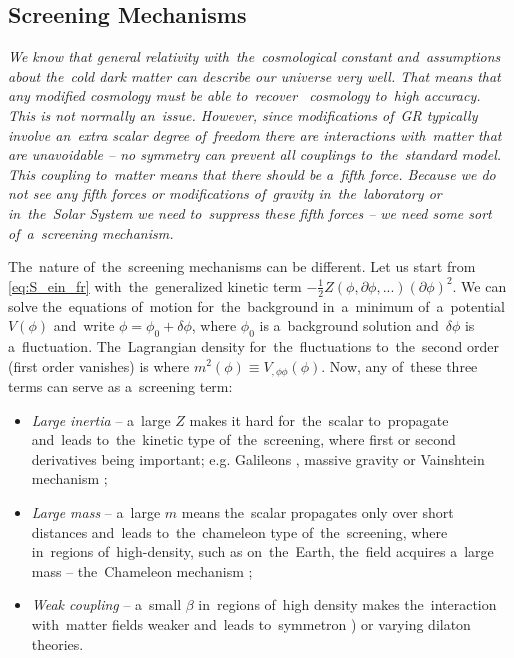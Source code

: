 \subsection{Screening Mechanisms}
{\itshape
We know that general relativity with~the~cosmological constant and~assumptions about the~cold dark matter can describe our universe very well. That means that any modified cosmology must be able to~recover \LCDM\ cosmology to~high accuracy. This is not normally an~issue. However, since modifications of~GR typically involve an~extra scalar degree of~freedom there are interactions with~matter that are unavoidable -- no symmetry can prevent all couplings to~the~standard model. This coupling to~matter means that there should be a~fifth force. Because we do not see any fifth forces or modifications of~gravity in~the~laboratory or in~the~Solar System we need to~suppress these fifth forces -- we need some sort of~a~\textit{screening mechanism}.

The~nature of~the~screening mechanisms can be different. Let us start from \eqref{eq:S_ein_fr} with~the~generalized kinetic term $-\frac12 Z(\phi,\partial\phi,...)(\partial\phi)^2$. We can solve the~equations of~motion for~the~background in~a~minimum of~a~potential $V(\phi)$ and~write $\phi=\phi_0+\delta\phi$, where $\phi_0$ is a~background solution and~$\delta\phi$ is a~fluctuation. The~Lagrangian density for~the~fluctuations to~the~second order (first order vanishes) is
where $m^2(\phi)\equiv V_{,\phi\phi}(\phi)$. Now, any of~these three terms can serve as a~screening term:
\begin{itemize}
	\item  \textit{Large inertia} -- a~large $Z$ makes it hard for~the~scalar to~propagate and~leads to~the~kinetic type of~the~screening, where first or second derivatives being important; e.g. Galileons \parencite{2009PhRvD..79f4036N}, massive gravity \parencite{2012RvMP...84..671H} or Vainshtein mechanism \parencite{2013CQGra..30r4001B};
	\item \textit{Large mass} --  a~large $m$ means the~scalar propagates only over short distances and~leads to~the~chameleon type of~the~screening, where in~regions of~high-density, such as on~the~Earth, the~field acquires a~large mass -- the~Chameleon mechanism \parencite{Waterhouse:2006wv};
	\item \textit{Weak coupling} -- a~small $\beta$ in~regions of~high density makes the~interaction with~matter fields weaker and~leads to~symmetron \parencite{2010PhRvL.104w1301H}) or varying dilaton \parencite{Damour:1994zq,2011PhRvD..83j4026B} theories.
\end{itemize}
}